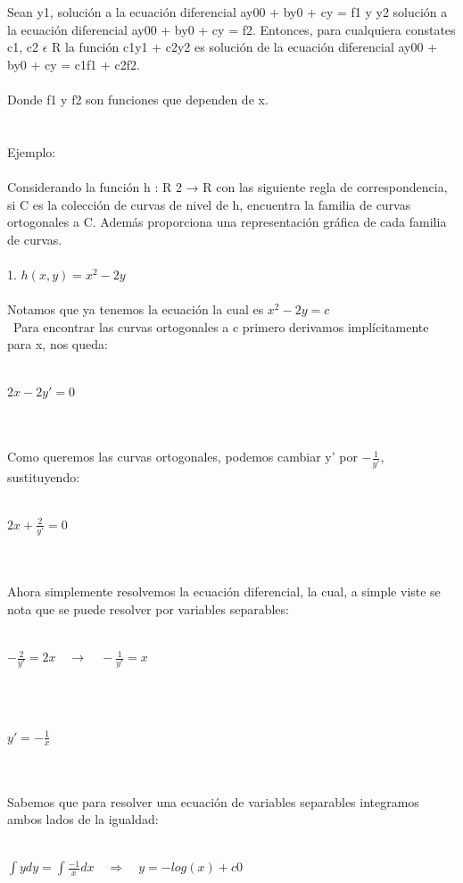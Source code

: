 \documentclass[a4paper,10pt]{article}
\begin{document}
Sean y1, solución a la ecuación diferencial ay00 + by0 + cy = f1 y y2 solución a la ecuación diferencial ay00 + by0 + cy = f2. Entonces, para cualquiera constates c1, c2 $\epsilon$ R la función c1y1 + c2y2 es solución de la ecuación diferencial ay00 + by0 + cy = c1f1 + c2f2.\\\\
Donde f1 y f2 son funciones que dependen de x.\\\\\\
Ejemplo:\\\\
Considerando la función h : R
2 → R con las siguiente regla de
correspondencia, si C es la colección de curvas de nivel de h,
encuentra la familia de curvas ortogonales a C. Además
proporciona una representación gráfica de cada familia de curvas.\\\\
1. $h(x,y)=x^2 -2y$\\\\
Notamos que ya tenemos la ecuación la cual es $x^2 -2y = c$\\\
Para encontrar las curvas ortogonales a c primero derivamos implícitamente para x, nos queda:\\\\
\centerline{$2x -2y' = 0$}\\\\
Como queremos las curvas ortogonales, podemos cambiar y' por $-\frac{1}{y'}$, sustituyendo:\\\\
\centerline{$2x + \frac{2}{y'} = 0 $}\\\\
Ahora simplemente resolvemos la ecuación diferencial, la cual, a simple viste se nota que se puede resolver por variables separables:\\\\
\centerline{$-\frac{2}{y'} = 2x \quad \rightarrow\quad -\frac{1}{y'}= x$}\\\\ 
\centerline{$y'=-\frac{1}{x}$}\\\\
Sabemos que para resolver una ecuación de variables separables integramos ambos lados de la igualdad:\\\\
\centerline{$\int y dy = \int \frac{-1}{x} dx\quad\Longrightarrow\quad y=-log(x) + c0$}\\\\
\end{document}
